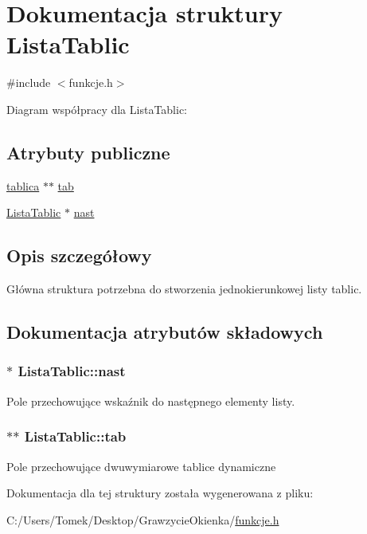 \hypertarget{struct_lista_tablic}{}\section{Dokumentacja struktury Lista\+Tablic}
\label{struct_lista_tablic}


{\ttfamily \#include $<$funkcje.\+h$>$}



Diagram współpracy dla Lista\+Tablic\+:
\subsection*{Atrybuty publiczne}
\begin{DoxyCompactItemize}
\item 
\hyperlink{structtablica}{tablica} $\ast$$\ast$ \hyperlink{struct_lista_tablic_aac122b9f8c56e180d272f2cd3d8320bb}{tab}
\item 
\hyperlink{struct_lista_tablic}{Lista\+Tablic} $\ast$ \hyperlink{struct_lista_tablic_a9dbb616cb002f19e10550be27707ce2d}{nast}
\end{DoxyCompactItemize}


\subsection{Opis szczegółowy}
Główna struktura potrzebna do stworzenia jednokierunkowej listy tablic. 

\subsection{Dokumentacja atrybutów składowych}
\hypertarget{struct_lista_tablic_a9dbb616cb002f19e10550be27707ce2d}{}
\subsubsection[{nast}]{$\ast$ Lista\+Tablic\+::nast}\label{struct_lista_tablic_a9dbb616cb002f19e10550be27707ce2d}
Pole przechowujące wskaźnik do następnego elementy listy. \hypertarget{struct_lista_tablic_aac122b9f8c56e180d272f2cd3d8320bb}{}
\subsubsection[{tab}]{$\ast$$\ast$ Lista\+Tablic\+::tab}\label{struct_lista_tablic_aac122b9f8c56e180d272f2cd3d8320bb}
Pole przechowujące dwuwymiarowe tablice dynamiczne 

Dokumentacja dla tej struktury została wygenerowana z pliku\+:\begin{DoxyCompactItemize}
\item 
C\+:/\+Users/\+Tomek/\+Desktop/\+Grawzycie\+Okienka/\hyperlink{funkcje_8h}{funkcje.\+h}\end{DoxyCompactItemize}
